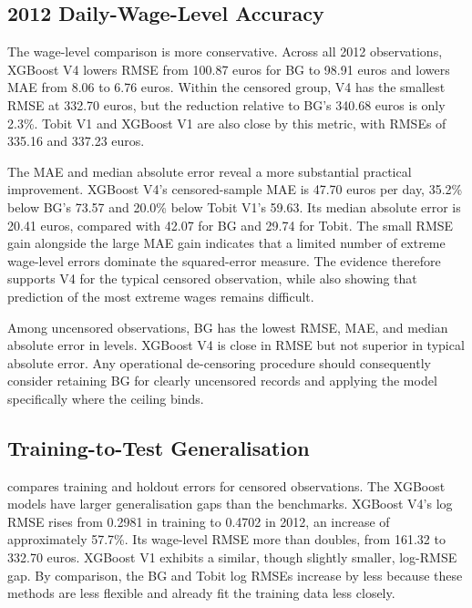 \documentclass[12pt,a4paper,oneside,titlepage]{book}
\begin{document}
\subsection{2012 Daily-Wage-Level Accuracy}



The wage-level comparison is more conservative. Across all 2012 observations, XGBoost V4 lowers RMSE from 100.87 euros for BG to 98.91 euros and lowers MAE from 8.06 to 6.76 euros. Within the censored group, V4 has the smallest RMSE at 332.70 euros, but the reduction relative to BG's 340.68 euros is only 2.3\%. Tobit V1 and XGBoost V1 are also close by this metric, with RMSEs of 335.16 and 337.23 euros.

The MAE and median absolute error reveal a more substantial practical improvement. XGBoost V4's censored-sample MAE is 47.70 euros per day, 35.2\% below BG's 73.57 and 20.0\% below Tobit V1's 59.63. Its median absolute error is 20.41 euros, compared with 42.07 for BG and 29.74 for Tobit. The small RMSE gain alongside the large MAE gain indicates that a limited number of extreme wage-level errors dominate the squared-error measure. The evidence therefore supports V4 for the typical censored observation, while also showing that prediction of the most extreme wages remains difficult.

Among uncensored observations, BG has the lowest RMSE, MAE, and median absolute error in levels. XGBoost V4 is close in RMSE but not superior in typical absolute error. Any operational de-censoring procedure should consequently consider retaining BG for clearly uncensored records and applying the model specifically where the ceiling binds.

\subsection{Training-to-Test Generalisation}
 compares training and holdout errors for censored observations. The XGBoost models have larger generalisation gaps than the benchmarks. XGBoost V4's log RMSE rises from 0.2981 in training to 0.4702 in 2012, an increase of approximately 57.7\%. Its wage-level RMSE more than doubles, from 161.32 to 332.70 euros. XGBoost V1 exhibits a similar, though slightly smaller, log-RMSE gap. By comparison, the BG and Tobit log RMSEs increase by less because these methods are less flexible and already fit the training data less closely.
\end{document}
